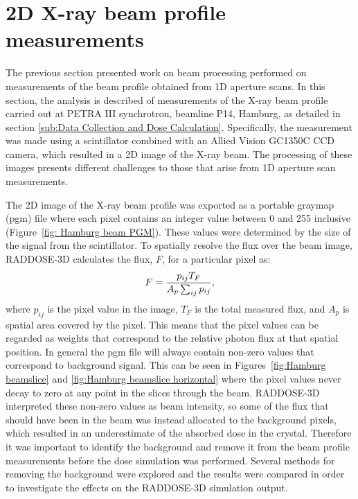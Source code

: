 \section{2D X-ray beam profile measurements}
\label{sec:2D X-ray beam profile measurements}
The previous section presented work on beam processing performed on measurements of the beam profile obtained from 1D aperture scans.
In this section, the analysis is described of measurements of the X-ray beam profile carried out at PETRA III synchrotron, beamline P14, Hamburg, as detailed in section \ref{sub:Data Collection and Dose Calculation}.
Specifically, the measurement was made using a scintillator combined with an Allied Vision GC1350C CCD camera, which resulted in a 2D image of the X-ray beam.
The processing of these images presents different challenges to those that arise from 1D aperture scan measurements.

The 2D image of the X-ray beam profile was exported as a portable graymap (pgm) file where each pixel contains an integer value between 0 and 255 inclusive (Figure~\ref{fig: Hamburg beam PGM}).
These values were determined by the size of the signal from the scintillator.
To spatially resolve the flux over the beam image, RADDOSE-3D calculates the flux, $F$, for a particular pixel as:
\begin{equation}
    F = \frac{p_{ij}T_F}{A_p\sum_{ij}p_{ij}},
\end{equation}
where $p_{ij}$ is the pixel value in the image, $T_F$ is the total measured flux, and $A_p$ is spatial area covered by the pixel.
This means that the pixel values can be regarded as weights that correspond to the relative photon flux at that spatial position.
In general the pgm file will always contain non-zero values that correspond to background signal.
This can be seen in Figures~\ref{fig:Hamburg beamslice} and \ref{fig:Hamburg beamslice horizontal} where the pixel values never decay to zero at any point in the slices through the beam.
RADDOSE-3D interpreted these non-zero values as beam intensity, so some of the flux that should have been in the beam was instead allocated to the background pixels, which resulted in an underestimate of the absorbed dose in the crystal.
Therefore it was important to identify the background and remove it from the beam profile measurements before the dose simulation was performed.
Several methods for removing the background were explored and the results were compared in order to investigate the effects on the RADDOSE-3D simulation output.

